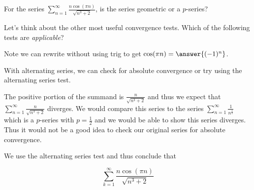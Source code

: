 \documentclass{ximera}
\begin{document}
\begin{exercise}
\begin{hint}
\begin{question}
\begin{multipleChoice}
\end{multipleChoice}

\end{question}

\begin{question}

For the series $\sum_{n=1}^{\infty} \frac{n\cos(\pi n)}{\sqrt{n^3+2}}$, is the series geometric or a $p$-series?

\begin{multipleChoice}
\end{multipleChoice}

Let's think about the other most useful convergence tests.  Which of the following tests are \emph{applicable}?

\begin{selectAll}
\end{selectAll}

Note we can rewrite without using trig to get $\cos(\pi n)=\answer{(-1)^n}$. 

With alternating series, we can check for absolute convergence or try using the alternating series test. 

The positive portion of the summand is $\frac{n}{\sqrt{n^3+2}}$ and thus we expect that $\sum^{\infty}_{n=1}\frac{n}{\sqrt{n^3+2}}$ diverges. We would compare this series to the series $\sum^{\infty}_{n=1}\frac{1}{n^{\frac{1}{2}}}$ which is a $p$-series with $p=\frac{1}{2}$ and we would be able to show this series diverges.  Thus it would not be a good idea to check our original series for absolute convergence.

We use the alternating series test and thus conclude that

\[
\sum_{k=1}^{\infty} \frac{n \cos(\pi n)}{\sqrt{n^3+2}}
\]

\begin{multipleChoice}
\end{multipleChoice}

\end{question}
\end{hint}








\end{exercise}
\end{document}
